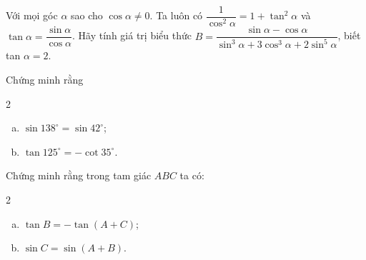 \begin{bt}%
Với mọi góc $\alpha$ sao cho $\cos \alpha \neq 0$. Ta luôn có $\dfrac{1}{\cos ^{2} \alpha}=1+\tan ^{2} \alpha$ và $\tan \alpha=\dfrac{\sin \alpha}{\cos \alpha}$.
Hãy tính giá trị biểu thức $B=\dfrac{\sin \alpha-\cos \alpha}{\sin ^{3} \alpha+3 \cos ^{3} \alpha+2 \sin ^{5} \alpha}$, biết tan $\alpha=2$.
\end{bt}

\begin{bt}%
	Chứng minh rằng
	\begin{multicols}{2}
		\begin{enumerate}[a)]
			\item $\sin 138^\circ=\sin 42^\circ$;
			\item $\tan 125^\circ=-\cot 35^\circ$.
		\end{enumerate}
	\end{multicols}
\end{bt}

\begin{bt}%
	Chứng minh rằng trong tam giác $ABC$ ta có:
	\begin{multicols}{2}
		\begin{enumerate}[a)]
			\item $\tan B=-\tan (A+C)$;
			\item $\sin C=\sin (A+B)$.
		\end{enumerate}
	\end{multicols}
\end{bt}

